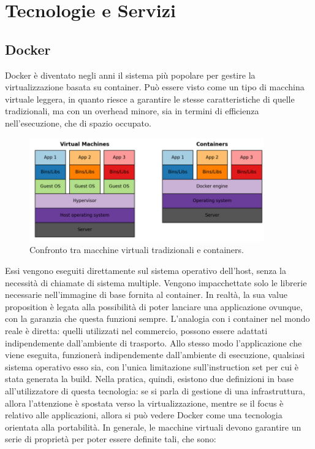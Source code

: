 \chapter{Tecnologie e Servizi}

\section{Docker}

Docker è diventato negli anni il sistema più popolare per gestire la virtualizzazione basata su container. Può essere visto come un tipo di macchina virtuale leggera, in quanto riesce a garantire le stesse caratteristiche di quelle tradizionali, ma con un overhead minore, sia in termini di efficienza nell'esecuzione, che di spazio occupato. 

\begin{figure}[htbp]
    \centering
    \includegraphics[width=0.9\textwidth]{figures/containers-and-vms.png}
    \caption{Confronto tra macchine virtuali tradizionali e containers.} 
    \label{fig:virt-tech}
\end{figure}

Essi vengono eseguiti direttamente sul sistema operativo dell'host, senza la necessità di chiamate di sistema multiple. Vengono impacchettate solo le librerie necessarie nell'immagine di base fornita al container. In realtà, la sua value proposition è legata alla possibilità di poter lanciare una applicazione ovunque, con la garanzia che questa funzioni sempre. L'analogia con i container nel mondo reale è diretta: quelli utilizzati nel commercio, possono essere adattati indipendemente dall'ambiente di trasporto. Allo stesso modo l'applicazione che viene eseguita, funzionerà indipendemente dall'ambiente di esecuzione, qualsiasi sistema operativo esso sia, con l'unica limitazione sull'instruction set per cui è stata generata la build.  Nella pratica, quindi, esistono due definizioni in base all'utilizzatore di questa tecnologia: se si parla di gestione di una infrastruttura, allora l'attenzione è spostata verso la virtualizzazione, mentre se il focus è relativo alle applicazioni, allora si può vedere Docker come una tecnologia orientata alla portabilità. In generale, le macchine virtuali devono garantire un serie di proprietà per poter essere definite tali, che sono:

